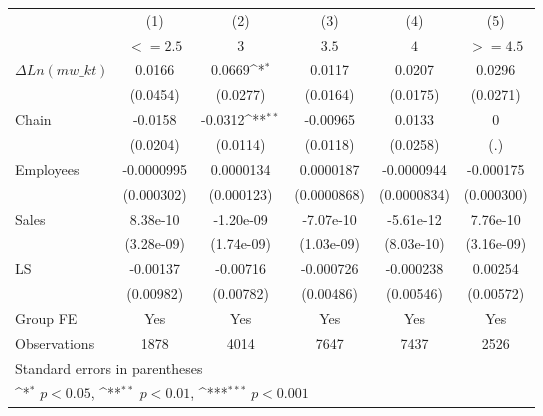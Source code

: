 {
\def\sym#1{\ifmmode^{#1}\else\(^{#1}\)\fi}
\begin{tabular}{l*{5}{c}}
\hline\hline
                    &\multicolumn{1}{c}{(1)}&\multicolumn{1}{c}{(2)}&\multicolumn{1}{c}{(3)}&\multicolumn{1}{c}{(4)}&\multicolumn{1}{c}{(5)}\\
                    &\multicolumn{1}{c}{$ <=2.5 $}&\multicolumn{1}{c}{$ 3 $}&\multicolumn{1}{c}{$3.5$}&\multicolumn{1}{c}{ $ 4 $}&\multicolumn{1}{c}{ $  >=4.5 $ }\\
\hline
$\Delta Ln(mw\_{kt}) $&      0.0166         &      0.0669\sym{*}  &      0.0117         &      0.0207         &      0.0296         \\
                    &    (0.0454)         &    (0.0277)         &    (0.0164)         &    (0.0175)         &    (0.0271)         \\
[1em]
Chain               &     -0.0158         &     -0.0312\sym{**} &    -0.00965         &      0.0133         &           0         \\
                    &    (0.0204)         &    (0.0114)         &    (0.0118)         &    (0.0258)         &         (.)         \\
[1em]
Employees           &  -0.0000995         &   0.0000134         &   0.0000187         &  -0.0000944         &   -0.000175         \\
                    &  (0.000302)         &  (0.000123)         & (0.0000868)         & (0.0000834)         &  (0.000300)         \\
[1em]
Sales               &    8.38e-10         &   -1.20e-09         &   -7.07e-10         &   -5.61e-12         &    7.76e-10         \\
                    &  (3.28e-09)         &  (1.74e-09)         &  (1.03e-09)         &  (8.03e-10)         &  (3.16e-09)         \\
[1em]
LS                  &    -0.00137         &    -0.00716         &   -0.000726         &   -0.000238         &     0.00254         \\
                    &   (0.00982)         &   (0.00782)         &   (0.00486)         &   (0.00546)         &   (0.00572)         \\
\hline
Group FE        &        Yes         &        Yes        &        Yes         &        Yes         &        Yes         \\

Observations        &        1878         &        4014         &        7647         &        7437         &        2526         \\
\hline\hline
\multicolumn{6}{l}{\footnotesize Standard errors in parentheses}\\
\multicolumn{6}{l}{\footnotesize \sym{*} \(p<0.05\), \sym{**} \(p<0.01\), \sym{***} \(p<0.001\)}\\
\end{tabular}
}
